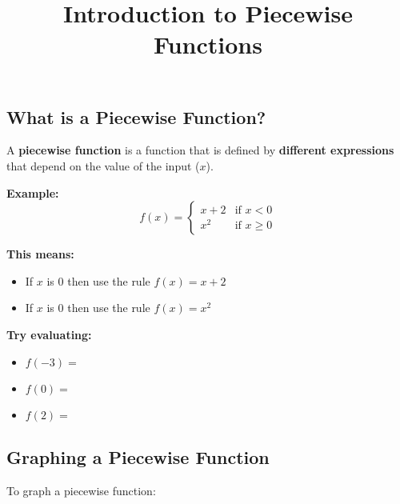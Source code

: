 \documentclass[12pt]{article}
\title{Introduction to Piecewise Functions}
\date{}
\begin{document}

\subsection*{What is a Piecewise Function?}

A \textbf{piecewise function} is a function that is defined by \textbf{different expressions} that depend on the value of the input ($x$).

\vspace{0.5cm}

\noindent
\textbf{Example:}
\[
f(x) = 
\begin{cases}
x + 2 & \text{if } x < 0 \\
x^2 & \text{if } x \geq 0
\end{cases}
\]

\textbf{This means:}
\begin{itemize}
  \item If $x$ is \underline{\hspace{2in}} 0 then use the rule $f(x) = x + 2$
  \item If $x$ is \underline{\hspace{3.5in}} 0 then use the rule $f(x) = x^2$
\end{itemize}

\vspace{0.3cm}

\noindent\textbf{Try evaluating:}

\begin{itemize}
  \item $f(-3) = $ \underline{\hspace{1in}}
  \item $f(0) = $ \underline{\hspace{1in}}
  \item $f(2) = $ \underline{\hspace{1in}}
\end{itemize}

\vspace{0.5cm}

\subsection*{Graphing a Piecewise Function}

To graph a piecewise function:
\end{document}
